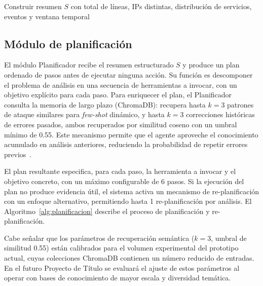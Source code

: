 \begin{algorithm}[H]
\caption{Preprocesamiento y agregación de logs}
\label{alg:agregacion}
Construir resumen $S$ con total de líneas, IPs distintas,
distribución de servicios, eventos y ventana temporal\;
\;
\end{algorithm}


\subsection{Módulo de planificación}

El módulo Planificador recibe el resumen estructurado $S$ y
produce un plan ordenado de pasos antes de ejecutar ninguna
acción. Su función es descomponer el problema de análisis en
una secuencia de herramientas a invocar, con un objetivo
explícito para cada paso. Para enriquecer el plan, el
Planificador consulta la memoria de largo plazo (ChromaDB):
recupera hasta $k=3$ patrones de ataque similares para
\textit{few-shot} dinámico, y hasta $k=3$ correcciones
históricas de errores pasados, ambos recuperados por similitud
coseno con un umbral mínimo de 0.55. Este mecanismo permite
que el agente aproveche el conocimiento acumulado en análisis
anteriores, reduciendo la probabilidad de repetir errores
previos~\cite{lee2025logrespagent}.

El plan resultante especifica, para cada paso, la herramienta
a invocar y el objetivo concreto, con un máximo configurable
de 6 pasos. Si la ejecución del plan no produce evidencia
útil, el sistema activa un mecanismo de re-planificación con
un enfoque alternativo, permitiendo hasta 1 re-planificación
por análisis. El Algoritmo~\ref{alg:planificacion} describe
el proceso de planificación y re-planificación.

Cabe señalar que los parámetros de recuperación semántica
($k=3$, umbral de similitud 0.55) están calibrados para el
volumen experimental del prototipo actual, cuyas colecciones
ChromaDB contienen un número reducido de entradas. En el futuro Proyecto de Título se evaluará el ajuste de estos parámetros
al operar con bases de conocimiento de mayor escala y
diversidad temática.

